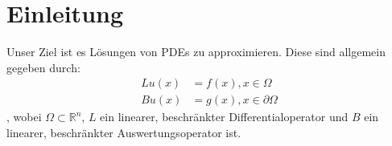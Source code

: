 \chapter{Einleitung}
\label{cha:Einleitung}
Unser Ziel ist es Lösungen von \acp{PDE} zu approximieren. Diese sind allgemein gegeben durch:
\begin{align*}
L u(x) &= f(x), x \in \Omega \\
B u(x) &= g(x), x \in \partial \Omega
\end{align*}
, wobei $\Omega \subset \mathbb{R}^n$, $L$ ein linearer, beschränkter Differentialoperator und $B$ ein linearer, beschränkter Auswertungsoperator ist.